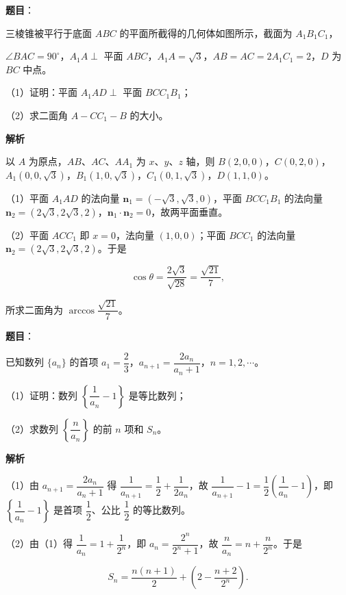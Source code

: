 \begin{answer}

\textbf{题目}：

三棱锥被平行于底面 $ABC$ 的平面所截得的几何体如图所示，截面为 $A_1B_1C_1$，

$\angle BAC=90^\circ$，$A_1A\perp$ 平面 $ABC$，$A_1A=\sqrt3$，$AB=AC=2A_1C_1=2$，$D$ 为 $BC$ 中点。

（1）证明：平面 $A_1AD\perp$ 平面 $BCC_1B_1$；

（2）求二面角 $A-CC_1-B$ 的大小。
\nopagebreak[4]
\begin{center}\end{center}
\nopagebreak[4]
\textbf{解析}

以 $A$ 为原点，$AB$、$AC$、$AA_1$ 为 $x$、$y$、$z$ 轴，则 $B(2,0,0)$，$C(0,2,0)$，$A_1(0,0,\sqrt3)$，$B_1(1,0,\sqrt3)$，$C_1(0,1,\sqrt3)$，$D(1,1,0)$。

（1）平面 $A_1AD$ 的法向量 $\boldsymbol n_1=(-\sqrt3,\sqrt3,0)$，平面 $BCC_1B_1$ 的法向量 $\boldsymbol n_2=(2\sqrt3,2\sqrt3,2)$，$\boldsymbol n_1\cdot\boldsymbol n_2=0$，故两平面垂直。

（2）平面 $ACC_1$ 即 $x=0$，法向量 $(1,0,0)$；平面 $BCC_1$ 的法向量 $\boldsymbol n_2=(2\sqrt3,2\sqrt3,2)$。于是

\nopagebreak[4]
\[\cos\theta=\frac{2\sqrt3}{\sqrt{28}}=\frac{\sqrt{21}}7,\]

所求二面角为 $\arccos\dfrac{\sqrt{21}}7$。


\end{answer}
\begin{answer}

\textbf{题目}：

已知数列 $\{a_n\}$ 的首项 $a_1=\dfrac23$，$a_{n+1}=\dfrac{2a_n}{a_n+1}$，$n=1,2,\cdots$。

（1）证明：数列 $\left\{\dfrac1{a_n}-1\right\}$ 是等比数列；

（2）求数列 $\left\{\dfrac n{a_n}\right\}$ 的前 $n$ 项和 $S_n$。

\textbf{解析}

（1）由 $a_{n+1}=\dfrac{2a_n}{a_n+1}$ 得 $\dfrac1{a_{n+1}}=\dfrac12+\dfrac1{2a_n}$，故 $\dfrac1{a_{n+1}}-1=\dfrac12\left(\dfrac1{a_n}-1\right)$，即 $\left\{\dfrac1{a_n}-1\right\}$ 是首项 $\dfrac12$、公比 $\dfrac12$ 的等比数列。

（2）由（1）得 $\dfrac1{a_n}=1+\dfrac1{2^n}$，即 $a_n=\dfrac{2^n}{2^n+1}$，故 $\dfrac n{a_n}=n+\dfrac n{2^n}$。于是

\nopagebreak[4]
\[S_n=\frac{n(n+1)}2+\left(2-\frac{n+2}{2^n}\right).\]


\end{answer}
